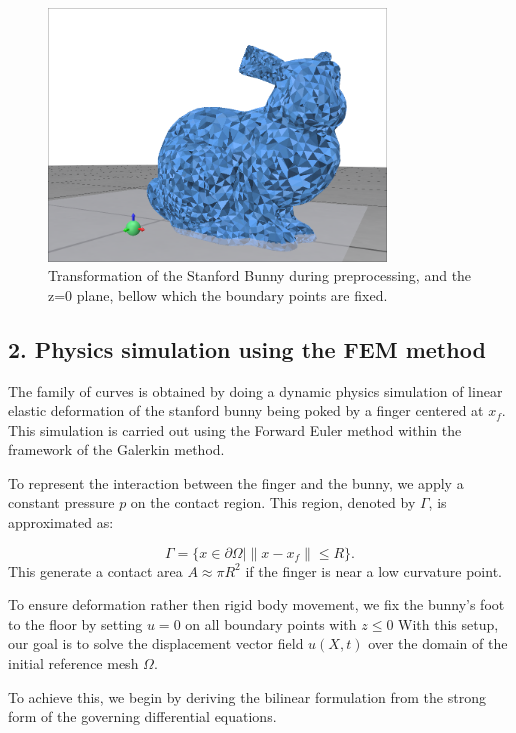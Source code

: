 \documentclass[a4paper,12pt]{article}
\begin{document}
\begin{figure}[h!]
	\centering
	\includegraphics[width=0.8\textwidth]{proj/1-load-transform-bunny.png}
	\caption{Transformation of the Stanford Bunny during preprocessing, and the z=0 plane, bellow which the boundary points are fixed. }
	\label{fig:transform-bunny}
\end{figure}

\newpage
\subsection*{2. Physics simulation using the FEM method}
The family of curves is obtained by doing a dynamic physics simulation of linear elastic deformation of the stanford bunny being poked by a finger centered at $x_f$. This simulation is carried out using the Forward Euler method within the framework of the Galerkin method.

To represent the interaction between the finger and the bunny, we apply a constant pressure $p$ on the contact region. This region, denoted by $\Gamma$, is approximated as:

\[
	\Gamma = \{ x \in \partial \Omega \mid \|x - x_f\| \leq R \}.
\]
This generate a contact area $A \approx \pi R^2$ if the finger is near a low curvature point.

To ensure deformation rather then rigid body movement, we fix the bunny's foot to the floor by setting $u = 0$ on all boundary points with $ z \leq 0$
\newpage
With this setup, our goal is to solve the displacement vector field \( u(X, t) \) over the domain of the initial reference mesh \( \Omega \).

To achieve this, we begin by deriving the bilinear formulation from the strong form of the governing differential equations.
\end{document}
